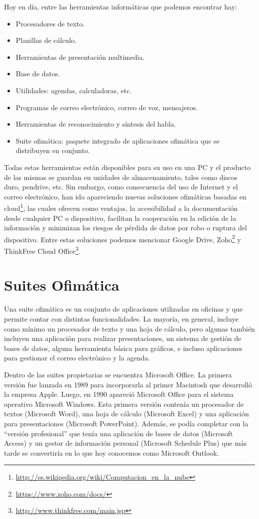 \documentclass[12pt]{article}
\begin{document}
Hoy en día, entre las herramientas informáticas que podemos encontrar hay:
\begin{itemize}
\item Procesadores de texto.
\item Planillas de cálculo.
\item Herramientas de presentación multimedia.
\item Base de datos.
\item Utilidades: agendas, calculadoras, etc.
\item Programas de correo electrónico, correo de voz, mensajeros.
\item Herramientas de reconocimiento y síntesis del habla.
\item Suite ofimática: paquete integrado de aplicaciones ofimática que se distribuyen en conjunto. 
\end{itemize}

Todas estas herramientas están disponibles para su uso en una PC y el producto de las mismas se guardan en unidades de almacenamiento, tales como discos duro, pendrive, etc. Sin embargo, como consecuencia del uso de Internet y el correo electrónico, han ido apareciendo nuevas soluciones ofimáticas basadas en cloud\footnote{\url{http://es.wikipedia.org/wiki/Computacion\_en\_la\_nube}}, las cuales ofrecen como ventajas, la accesibilidad a la documentación desde cualquier PC o dispositivo, facilitan la cooperación en la edición de la información y minimizan los riesgos de pérdida de datos por robo o ruptura del dispositivo. Entre estas soluciones podemos mencionar Google Drive, Zoho\footnote{\url{https://www.zoho.com/docs/}} y ThinkFree Cloud Office\footnote{\url{http://www.thinkfree.com/main.jsp}}.

\section{Suites Ofimática}

Una suite ofimática es un conjunto de aplicaciones utilizadas en oficinas y que permite contar con distintas funcionalidades. La mayoría, en general, incluye como mínimo un procesador de texto y una hoja de cálculo, pero algunas también incluyen una aplicación para realizar presentaciones,  un sistema de gestión de bases de datos, alguna herramienta básica para gráficos, e incluso aplicaciones para gestionar el correo electrónico y  la agenda.

Dentro de las suites propietarias se encuentra Microsoft Office. La primera versión fue lanzada en 1989 para incorporarla al primer Macintosh que desarrolló la empresa Apple. Luego, en 1990 apareció Microsoft Office para el sistema operativo Microsoft Windows. Esta primera versión contenía un procesador de textos (Microsoft Word), una hoja de cálculo (Microsoft Excel) y una aplicación para presentaciones (Microsoft PowerPoint). Además, se podía completar con la “versión profesional” que tenía una aplicación de bases de datos (Microsoft Access) y un gestor de información personal (Microsoft Schedule Plus) que más tarde se convertiría en lo que hoy conocemos como Microsoft Outlook.
\end{document}
